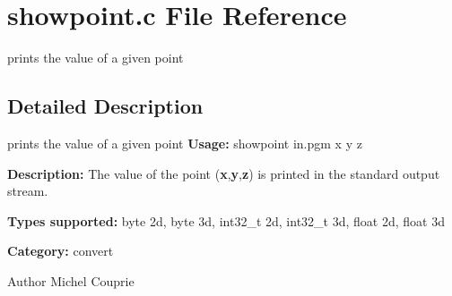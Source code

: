 \section{showpoint.c File Reference}
\label{showpoint_8c}


prints the value of a given point  




\subsection{Detailed Description}
prints the value of a given point {\bfseries Usage:} showpoint in.pgm x y z

{\bfseries Description:} The value of the point ({\bfseries x},{\bfseries y},{\bfseries z}) is printed in the standard output stream.

{\bfseries Types supported:} byte 2d, byte 3d, int32\_\-t 2d, int32\_\-t 3d, float 2d, float 3d

{\bfseries Category:} convert

\begin{DoxyAuthor}{Author}
Michel Couprie 
\end{DoxyAuthor}
